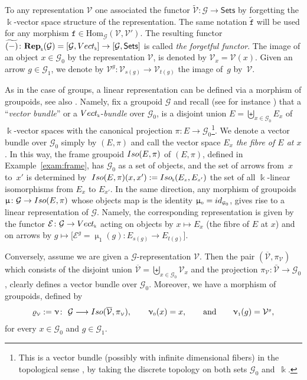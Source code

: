 \documentclass[11pt]{article}
\numberwithin{equation}{section}
\renewcommand{\hom}[3]{\mathrm{Hom}_{\Sscript{#1}}\left(#2, #3\right)}
\newcommand{\td}[1]{\widetilde{#1}}
\newcommand{\bara}[1]{\overline{#1}}
\newcommand{\Rep}[1]{\mathbf{Rep}_{\Sscript{\Bbbk}}(#1)}
\newcommand{\Vect}{{\rm Vect}_{\Sscript{\Bbbk}}}
\newcommand{\tF}{\texttt{f}}
\newcommand{\Go}{\cG_{\Sscript{0}}}
\newcommand{\Ga}{\cG_{\Sscript{1}}}
\newcommand{\Vx}{\cV_{\Sscript{x}}}
\newcommand{\Vg}{\cV^{\Sscript{g}}}
\newcommand{\cE}{{\mathcal E}}
\newcommand{\cG}{{\mathcal G}}
\newcommand{\cV}{{\mathcal V}}
\newcommand{\Sets}{\mathsf{Sets}}
\newcommand{\Sscript}[1]{\scriptscriptstyle{#1}}
\begin{document}
To any representation $\cV$ one associated the functor $\tilde{\cV}\colon \cG \to \Sets$ by forgetting the $\Bbbk$-vector space structure of the representation. The same notation $\tilde{\tF}$ will be used for any morphism $\tF \in \hom{\cG}{\cV}{\cV'}$. The resulting functor $\td{(-)}\colon \Rep{\cG}=[\cG, \Vect] \to [\cG, \Sets]$ is called \emph{the forgetful functor}. The image of an object $x \in \Go$ by the representation $\cV$, is denoted by $\Vx=\cV(x)$. Given an arrow $g \in \Ga$, we denote by $\Vg\colon \cV_{\Sscript{s(g)}} \to \cV_{\Sscript{t(g)}}$ the image of~$g$ by~$\cV$.

\begin{Remark}\label{rem:FrameGrpd}As in the case of groups, a linear representation can be defined via a morphism of groupoids, see also \cite[Definition~1.11]{Renault:1980}. Namely, fix a groupoid $\cG$ and recall (see for instance \cite[p.~98]{Sternberg:1994}) that a ``\emph{vector bundle}'' or a $\Vect$-\emph{bundle} over $\Go$, is a disjoint union $E=\biguplus_{ x \in \Go}E_{\Sscript{x}}$ of $\Bbbk$-vector spaces with the canonical projection $\pi\colon E \to \Go$\footnote{This is a vector bundle (possibly with infinite dimensional fibers) in the topological sense \cite[Definition~2.1]{Karoubi:1978}, by taking the discrete topology on both sets $\Go$ and~$\Bbbk$.}. We denote a vector bundle over $\Go$ simply by $(E,\pi)$ and call the vector space $E_{\Sscript{x}}$ \emph{the fibre of $E$ at $x$}. In this way, the frame groupoid ${\rm Iso}(E,\pi)$ of $(E,\pi)$, defined in Example~\ref{exam:frame}, has $\Go$ as a set of objects, and the set of arrows from~$x$ to~$x'$ is determined by~${\rm Iso}(E,\pi)(x,x'):={\rm Iso}_{\Sscript{\Bbbk}}( E_{\Sscript{x}}, E_{\Sscript{x'}})$ the set of all $\Bbbk$-linear isomorphisms from $E_{\Sscript{x}}$ to $E_{\Sscript{x'}}$. In the same direction, any morphism of groupoids $\upmu\colon \cG \to {\rm Iso}(E,\pi)$ whose objects map is the identity $\upmu_{\Sscript{0}}={\rm id}_{\Sscript{\Go}}$, gives rise to a linear representation of $\cG$. Namely, the corresponding representation is given by the functor $\cE\colon \cG \to \Vect$ acting on objects by $x \mapsto E_{\Sscript{x}}$ (the fibre of $E$ at $x$) and on arrows by $g \mapsto \big[\cE^{\Sscript{g}}=\upmu_{\Sscript{1}}(g)\colon E_{\Sscript{s(g)}} \to E_{\Sscript{t(g)}}\big]$.

Conversely, assume we are given a $\cG$-representation $\cV$. Then the pair $(\bara{\cV}, \pi_{\Sscript{\cV}})$ which consists of the disjoint union $\bara{\cV}=\biguplus_{x \in \Go}\Vx$ and the projection $\pi_{\Sscript{\cV}}\colon \bar{\cV} \to \Go$, clearly defines a vector bundle over $\Go$. Moreover, we have a morphism of groupoids, defined by
\begin{gather}\label{Eq:rhoV}
\varrho_{\Sscript{\cV}}:=\upnu\colon \ \cG \longrightarrow {\rm Iso}(\bara{\cV}, \pi_{\Sscript{\cV}}), \qquad \upnu_{\Sscript{0}}(x)=x, \qquad \text{and} \qquad \upnu_{\Sscript{1}}(g)=\Vg,
\end{gather}
for every $x \in \Go$ and $g \in \Ga$.


\end{Remark}
\end{document}
